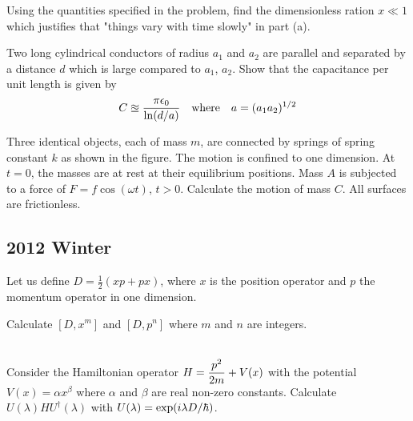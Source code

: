\documentclass[11pt,letterpaper]{article}
\begin{document}
			\item 
			Using the quantities specified in the problem, find the dimensionless ration $x\ll 1$ which justifies that 
			"things vary with time slowly" in part (a).
			\\
		\eenum
		
		
		\item Two long cylindrical conductors of radius $a_1$ and $a_2$ are parallel and separated by a distance $d$ which
		is large compared to $a_1$, $a_2$. Show that the capacitance per unit length is given by 
		\[
			C\approxeq \frac{\pi\epsilon_0}{\ln(d/a)}\quad\text{where}\quad a = (a_1a_2)^{1/2}
		\]
		
		
		\item Three identical objects, each of mass $m$, are connected by springs of spring constant $k$ as shown in the
		figure. The motion is confined to one dimension. At $t=0$, the masses are at rest at their equilibrium positions. Mass $A$
		is subjected to a force of $F = f\cos(\omega t)$, $t>0$. Calculate the motion of mass $C$. All surfaces are frictionless.
		
		
	\eenum
	
\phantom{}
\subsection*{2012 Winter}
\phantom{}
	\benum
		\item
		Let us define $D = \frac 12(xp+px)$, where $x$ is the position operator and $p$ the momentum operator in one dimension.
		\benum
			\item
			Calculate $[D,x^m]$ and $[D,p^n]$ where $m$ and $n$ are integers.
			\\
			\\
	
			\item
			Consider the Hamiltonian operator $\displaystyle H = \frac{p^2}{2m}+V(x)$ with the potential $V(x) = \alpha x^\beta$ where $\alpha$ and 
			$\beta$ are real non-zero constants. Calculate $U(\lambda)HU^\dag(\lambda)$ with $U(\lambda) = \exp(i\lambda D/\hbar)$.
	
\end{document}
